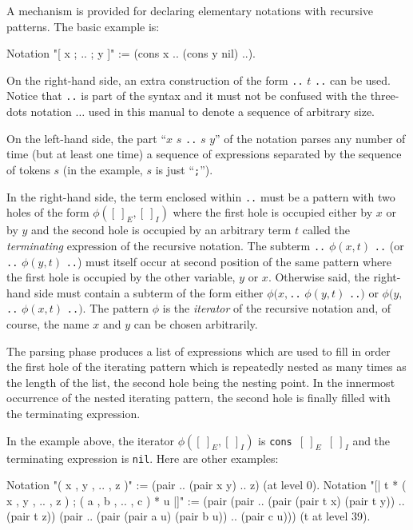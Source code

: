 A mechanism is provided for declaring elementary notations with
recursive patterns. The basic example is:

\begin{coq_example*}
Notation "[ x ; .. ; y ]" := (cons x .. (cons y nil) ..).
\end{coq_example*}

On the right-hand side, an extra construction of the form {\tt ..} $t$
{\tt ..} can be used. Notice that {\tt ..} is part of the {\Coq}
syntax and it must not be confused with the three-dots notation
$\ldots$ used in this manual to denote a sequence of arbitrary size.

On the left-hand side, the part ``$x$ $s$ {\tt ..} $s$ $y$'' of the
notation parses any number of time (but at least one time) a sequence
of expressions separated by the sequence of tokens $s$ (in the
example, $s$ is just ``{\tt ;}'').

In the right-hand side, the term enclosed within {\tt ..} must be a
pattern with two holes of the form $\phi([~]_E,[~]_I)$ where the first
hole is occupied either by $x$ or by $y$ and the second hole is
occupied by an arbitrary term $t$ called the {\it terminating}
expression of the recursive notation. The subterm {\tt ..} $\phi(x,t)$
{\tt ..} (or {\tt ..} $\phi(y,t)$ {\tt ..})  must itself occur at
second position of the same pattern where the first hole is occupied
by the other variable, $y$ or $x$. Otherwise said, the right-hand side
must contain a subterm of the form either $\phi(x,${\tt ..}
$\phi(y,t)$ {\tt ..}$)$ or $\phi(y,${\tt ..}  $\phi(x,t)$ {\tt ..}$)$.
The pattern $\phi$ is the {\em iterator} of the recursive notation
and, of course, the name $x$ and $y$ can be chosen arbitrarily.

The parsing phase produces a list of expressions which are used to
fill in order the first hole of the iterating pattern which is
repeatedly nested as many times as the length of the list, the second
hole being the nesting point. In the innermost occurrence of the
nested iterating pattern, the second hole is finally filled with the
terminating expression.

In the example above, the iterator $\phi([~]_E,[~]_I)$ is {\tt cons
  $[~]_E$ $[~]_I$} and the terminating expression is {\tt nil}. Here are
other examples:
\begin{coq_example*}
Notation "( x , y , .. , z )" := (pair .. (pair x y) .. z) (at level 0).
Notation "[| t * ( x , y , .. , z ) ; ( a , b , .. , c )  * u |]" :=
  (pair (pair .. (pair (pair t x) (pair t y)) .. (pair t z))
        (pair .. (pair (pair a u) (pair b u)) .. (pair c u)))
  (t at level 39).
\end{coq_example*}

